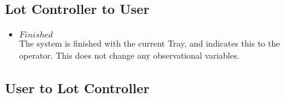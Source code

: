 \subsection{Lot Controller to User}
\begin{itemize}
    \item $\mathit{Finished}$ \\
    The system is finished with the current Tray, and indicates this to the operator.
    This does not change any observational variables.
\end{itemize}

\subsection{User to Lot Controller}
